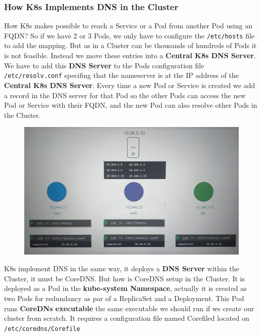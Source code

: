 \documentclass{article}
\begin{document}
\subsubsection{How K8s Implements DNS in the Cluster}
How K8s makes possible to reach a Service or a Pod from another Pod using an FQDN? So if we have 2 or 3 Pods, we only have to configure the \verb|/etc/hosts| file to add the mapping. But as in a Cluster can be thousands of hundreds of Pods it is not feasible. Instead we move these entries into a \textbf{Central K8s DNS Server}. We have to add this \textbf{DNS Server} to the Pods configuration file \verb|/etc/resolv.conf| specifing that the nameserver is at the IP address of the \textbf{Central K8s DNS Server}. Every time a new Pod or Service is created we add a record in the DNS server for that Pod so the other Pods can access the new Pod or Service with their FQDN, and the new Pod can also resolve other Pods in the Cluster.

\begin{figure}[H]
    \centering
    \includegraphics[width=\textwidth]{pictures/ingress2.png}
\end{figure}

K8s implement DNS in the same way, it deploys a \textbf{DNS Server} within the Cluster, it must be CoreDNS. But how is CoreDNS setup in the Cluster. It is deployed as a Pod in the \textbf{kube-system Namespace}, actually it is created as two Pods for redundancy as par of a ReplicaSet and a Deployment. This Pod runs \textbf{CoreDNs executable} the same executable we should run if we create our cluster from scratch. It requires a configuration file named Corefiled located on \verb|/etc/coredns/Corefile|
\end{document}
